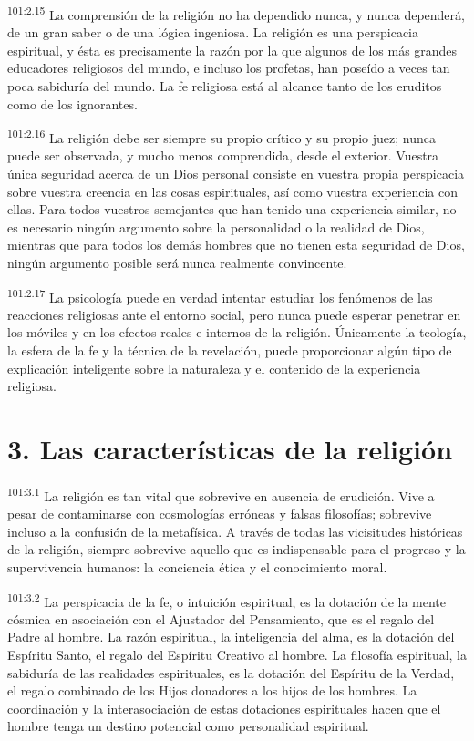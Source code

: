 \par
\textsuperscript{101:2.15} La comprensión de la religión no ha dependido nunca, y nunca dependerá, de un gran saber o de una lógica ingeniosa. La religión es una perspicacia espiritual, y ésta es precisamente la razón por la que algunos de los más grandes educadores religiosos del mundo, e incluso los profetas, han poseído a veces tan poca sabiduría del mundo. La fe religiosa está al alcance tanto de los eruditos como de los ignorantes.

\par
\textsuperscript{101:2.16} La religión debe ser siempre su propio crítico y su propio juez; nunca puede ser observada, y mucho menos comprendida, desde el exterior. Vuestra única seguridad acerca de un Dios personal consiste en vuestra propia perspicacia sobre vuestra creencia en las cosas espirituales, así como vuestra experiencia con ellas. Para todos vuestros semejantes que han tenido una experiencia similar, no es necesario ningún argumento sobre la personalidad o la realidad de Dios, mientras que para todos los demás hombres que no tienen esta seguridad de Dios, ningún argumento posible será nunca realmente convincente.

\par
\textsuperscript{101:2.17} La psicología puede en verdad intentar estudiar los fenómenos de las reacciones religiosas ante el entorno social, pero nunca puede esperar penetrar en los móviles y en los efectos reales e internos de la religión. Únicamente la teología, la esfera de la fe y la técnica de la revelación, puede proporcionar algún tipo de explicación inteligente sobre la naturaleza y el contenido de la experiencia religiosa.

\section*{3. Las características de la religión}
\par
\textsuperscript{101:3.1} La religión es tan vital que sobrevive en ausencia de erudición. Vive a pesar de contaminarse con cosmologías erróneas y falsas filosofías; sobrevive incluso a la confusión de la metafísica. A través de todas las vicisitudes históricas de la religión, siempre sobrevive aquello que es indispensable para el progreso y la supervivencia humanos: la conciencia ética y el conocimiento moral.

\par
\textsuperscript{101:3.2} La perspicacia de la fe, o intuición espiritual, es la dotación de la mente cósmica en asociación con el Ajustador del Pensamiento, que es el regalo del Padre al hombre. La razón espiritual, la inteligencia del alma, es la dotación del Espíritu Santo, el regalo del Espíritu Creativo al hombre. La filosofía espiritual, la sabiduría de las realidades espirituales, es la dotación del Espíritu de la Verdad, el regalo combinado de los Hijos donadores a los hijos de los hombres. La coordinación y la interasociación de estas dotaciones espirituales hacen que el hombre tenga un destino potencial como personalidad espiritual.

